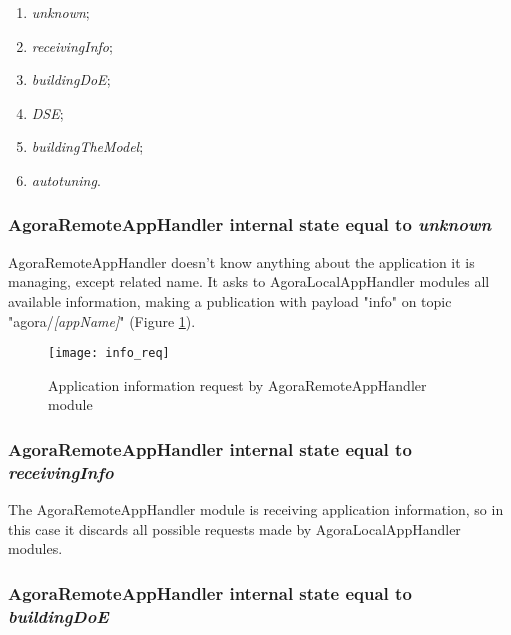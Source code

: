 \begin{enumerate}

    \item \textit{unknown};

    \item \textit{receivingInfo};

    \item \textit{buildingDoE};

    \item \textit{DSE};

    \item \textit{buildingTheModel};

    \item \textit{autotuning}.

\end{enumerate}


\subsubsection{AgoraRemoteAppHandler internal state equal to \textit{unknown}}\label{req_info}

AgoraRemoteAppHandler doesn't know anything about the application it is managing, except related name. It asks to AgoraLocalAppHandler modules all available information, making a publication with payload "info" on topic "agora/\textit{[appName]}" (Figure \ref{fig::remotInfoReq}).

\begin{figure}[ht]

    \centering
    \texttt{[image: info\_req]}
    \caption{Application information request by AgoraRemoteAppHandler module}

    \label{fig::remotInfoReq}
    
\end{figure}


\subsubsection{AgoraRemoteAppHandler internal state equal to \textit{receivingInfo}}

The AgoraRemoteAppHandler module is receiving application information, so in this case it discards all possible requests made by AgoraLocalAppHandler modules.


\subsubsection{AgoraRemoteAppHandler internal state equal to \textit{buildingDoE}}


